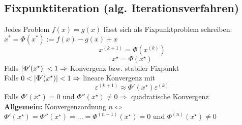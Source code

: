 \documentclass[german]{latex4ei/latex4ei_sheet}
\begin{document}
\begin{sectionbox}
\subsection{Fixpunktiteration (alg. Iterationsverfahren)}
Jedes Problem $f(x) = g(x)$ lässt sich als Fixpunktproblem schreiben:\\
$x^* = Φ(x^*) := f(x) - g(x) + x$
\begin{equation*}
	x^{(k + 1)} = \Phi(x^{(k)})
\end{equation*}
\begin{equation*}
	x^\star = \Phi(x^\star)
\end{equation*}
Falls $\left\vert\Phi'(x^\star)\right\vert < 1 \Rightarrow$ Konvergenz bzw. stabiler Fixpunkt \\
Falls $0 < \left\vert\Phi'(x^\star)\right\vert < 1 \Rightarrow$ lineare Konvergenz mit
\begin{equation*}
	\varepsilon^{(k + 1)} \approx \Phi'(x^\star) \varepsilon^{(k)}
\end{equation*}
Falls $\Phi'(x^\star) = 0$ und $\Phi''(x^\star) \ne 0 \Rightarrow$ quadratische Konvergenz \\
\textbf{Allgemein:} Konvergenzordnung $n \Leftrightarrow$\\ $\Phi'(x^\star) = \Phi''(x^\star) = \ldots = \Phi^{(n - 1)}(x^\star) = 0$ und $\Phi^{(n)}(x^\star) \ne 0$
\end{sectionbox}
\end{document}
